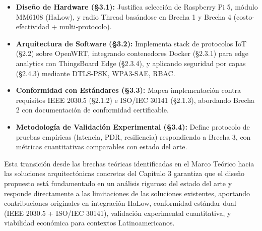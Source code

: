 \begin{itemize}
\item \textbf{Diseño de Hardware (§3.1):} Justifica selección de Raspberry Pi 5, módulo MM6108 (HaLow), y radio Thread basándose en Brecha 1 y Brecha 4 (costo-efectividad + multi-protocolo).
\item \textbf{Arquitectura de Software (§3.2):} Implementa stack de protocolos IoT (§2.2) sobre OpenWRT, integrando contenedores Docker (§2.3.1) para edge analytics con ThingsBoard Edge (§2.3.4), y aplicando seguridad por capas (§2.4.3) mediante DTLS-PSK, WPA3-SAE, RBAC.
\item \textbf{Conformidad con Estándares (§3.3):} Mapea implementación contra requisitos IEEE 2030.5 (§2.1.2) e ISO/IEC 30141 (§2.1.3), abordando Brecha 2 con documentación de conformidad certificable.
\item \textbf{Metodología de Validación Experimental (§3.4):} Define protocolo de pruebas empíricas (latencia, PDR, resiliencia) respondiendo a Brecha 3, con métricas cuantitativas comparables con estado del arte.
\end{itemize}

Esta transición desde las brechas teóricas identificadas en el Marco Teórico hacia las soluciones arquitectónicas concretas del Capítulo 3 garantiza que el diseño propuesto está fundamentado en un análisis riguroso del estado del arte y responde directamente a las limitaciones de las soluciones existentes, aportando contribuciones originales en integración HaLow, conformidad estándar dual (IEEE 2030.5 + ISO/IEC 30141), validación experimental cuantitativa, y viabilidad económica para contextos Latinoamericanos.

